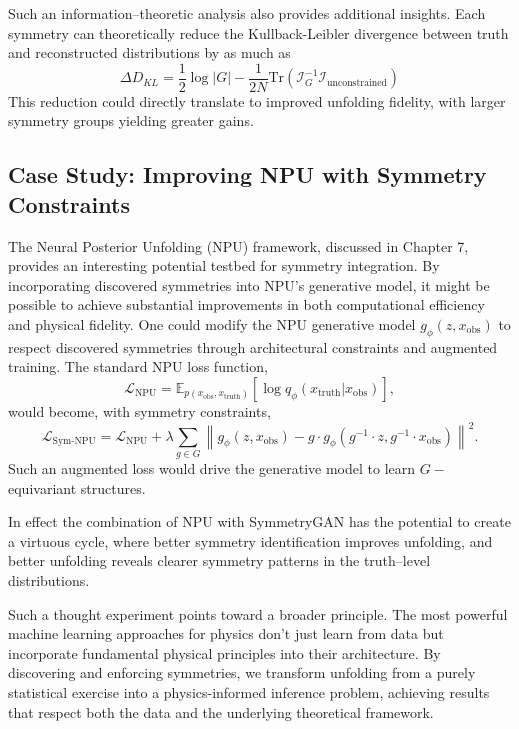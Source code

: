         Such an information--theoretic analysis also provides additional insights.
        Each symmetry can theoretically reduce the Kullback-Leibler divergence between truth and reconstructed distributions by as much as
        \[
            \Delta D_{KL} = \frac{1}{2} \log |G| - \frac{1}{2N} \text{Tr}(\mathcal{I}_G^{-1} \mathcal{I}_\text{unconstrained})
        \]
        This reduction could directly translate to improved unfolding fidelity, with larger symmetry groups yielding greater gains.

    \subsection{Case Study: Improving NPU with Symmetry Constraints}
        The Neural Posterior Unfolding (NPU) framework, discussed in Chapter 7, provides an interesting potential testbed for symmetry integration.
        By incorporating discovered symmetries into NPU's generative model, it might be possible to achieve substantial improvements in both computational efficiency and physical fidelity.
        One could modify the NPU generative model \(g_\phi(z, x_\text{obs})\) to respect discovered symmetries through architectural constraints and augmented training.
        The standard NPU loss function,
        \[
            \mathcal{L}_\text{NPU} = \mathbb{E}_{p(x_\text{obs}, x_\text{truth})} \left[ \log q_\phi(x_\text{truth} | x_\text{obs}) \right],
        \]
        would become, with symmetry constraints,
        \[
            \mathcal{L}_\text{Sym-NPU} = \mathcal{L}_\text{NPU} + \lambda \sum_{g \in G} \left\| g_\phi(z, x_\text{obs}) - g \cdot g_\phi(g^{-1} \cdot z, g^{-1} \cdot x_\text{obs}) \right\|^2.
        \]
        Such an augmented loss would drive the generative model to learn \(G-\)equivariant structures.
        
        In effect the combination of NPU with SymmetryGAN has the potential to create a virtuous cycle, where better symmetry identification improves unfolding, and better unfolding reveals clearer symmetry patterns in the truth--level distributions.

        Such a thought experiment points toward a broader principle.
        The most powerful machine learning approaches for physics don't just learn from data but incorporate fundamental physical principles into their architecture.
        By discovering and enforcing symmetries, we transform unfolding from a purely statistical exercise into a physics-informed inference problem, achieving results that respect both the data and the underlying theoretical framework.

